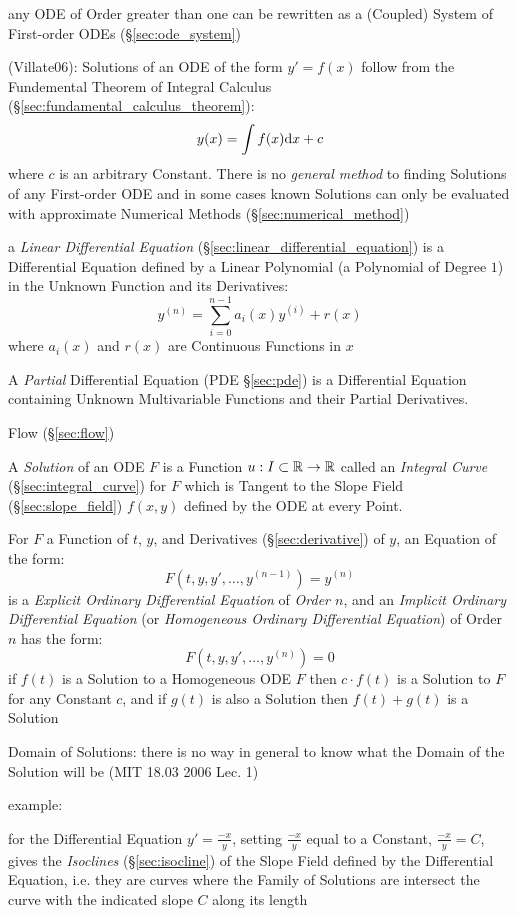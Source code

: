 any ODE of Order greater than one can be rewritten as a (Coupled) System of
First-order ODEs (\S\ref{sec:ode_system})

(Villate06): Solutions of an ODE of the form $y' = f(x)$ follow from the
Fundemental Theorem of Integral Calculus
(\S\ref{sec:fundamental_calculus_theorem}):
\[
y(x) = \int f(x) \mathrm{d}x + c
\]
where $c$ is an arbitrary Constant. There is no \emph{general method} to finding
Solutions of any First-order ODE and in some cases known Solutions can only be
evaluated with approximate Numerical Methods (\S\ref{sec:numerical_method})

\fist a \emph{Linear Differential Equation}
(\S\ref{sec:linear_differential_equation}) is a Differential Equation defined
by a Linear Polynomial (a Polynomial of Degree $1$) in the Unknown Function and
its Derivatives:
\[
  y^{(n)} = \sum_{i=0}^{n-1} a_i (x) y^{(i)} + r(x)
\]
where $a_i(x)$ and $r(x)$ are Continuous Functions in $x$

\fist A \emph{Partial} Differential Equation (PDE
\S\ref{sec:pde}) is a Differential Equation
containing Unknown Multivariable Functions and their Partial Derivatives.

\fist Flow (\S\ref{sec:flow})

A \emph{Solution} of an ODE $F$ is a Function $u : I \subset \mathbb{R} \rightarrow
\mathbb{R}$ called an \emph{Integral Curve} (\S\ref{sec:integral_curve}) for $F$
which is Tangent to the Slope Field (\S\ref{sec:slope_field}) $f(x,y)$ defined
by the ODE at every Point.

For $F$ a Function of $t$, $y$, and Derivatives (\S\ref{sec:derivative}) of
$y$, an Equation of the form:
\[
  F(t,y,y',\ldots,y^{(n-1)}) = y^{(n)}
\]
is a \emph{Explicit Ordinary Differential Equation} of \emph{Order $n$}, and an
\emph{Implicit Ordinary Differential Equation} (or \emph{Homogeneous Ordinary
  Differential Equation}) of Order $n$ has the form:
\[
  F(t,y,y',\ldots,y^{(n)}) = 0
\]
if $f(t)$ is a Solution to a Homogeneous ODE $F$ then $c\cdot{f(t)}$ is a
Solution to $F$ for any Constant $c$, and if $g(t)$ is also a Solution then
$f(t) + g(t)$ is a Solution


Domain of Solutions: there is no way in general to know what the Domain of the
Solution will be (MIT 18.03 2006 Lec. 1)

example:

for the Differential Equation $y' = \frac{-x}{y}$, setting $\frac{-x}{y}$ equal
to a Constant, $\frac{-x}{y} = C$, gives the \emph{Isoclines}
(\S\ref{sec:isocline}) of the Slope Field defined by the Differential Equation,
i.e. they are curves where the Family of Solutions are intersect the
curve with the indicated slope $C$ along its length

